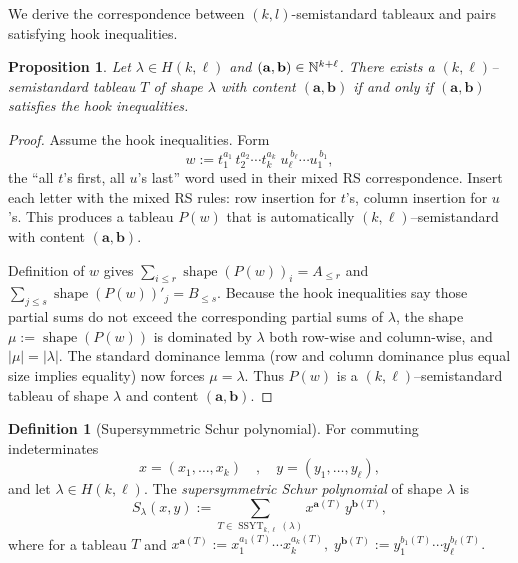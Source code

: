 \documentclass[12pt,a4paper,oneside]{amsart}
\newtheorem{proposition}{Proposition}[section]
\theoremstyle{definition}
\newtheorem{definition}{Definition}[section]
\begin{document}
We derive the correspondence between $(k,l)$-semistandard tableaux and pairs satisfying hook inequalities.
\begin{proposition}\label{prop:hook-content}
    Let $\lambda\in H(k,\ell)$ and
$(\mathbf a,\mathbf b)\in\Bbb N^{k+\ell}$.
There exists a $(k,\ell)$–semistandard tableau $T$ of shape $\lambda$
with content $(\mathbf a,\mathbf b)$ if and only if
$(\mathbf a,\mathbf b)$ satisfies the hook inequalities.
\end{proposition}

\begin{proof}
    Assume the hook inequalities. Form
\[
   w:=t_1^{a_1}\,t_2^{a_2}\cdots t_k^{a_k}\;
      u_\ell^{\,b_\ell}\cdots u_1^{\,b_1},
\]
the “all $t$’s first, all $u$’s last” word used in their mixed RS correspondence. Insert each letter with the mixed RS rules: row insertion for $t$'s, column insertion for $u$'s. This produces a tableau $P(w)$ that is automatically $(k,\ell)$–semistandard with content $(\mathbf a,\mathbf b)$.

Definition of $w$ gives \(\sum_{i\le r}\operatorname{shape}(P(w))_i=A_{\le r}\)
and \(\sum_{j\le s}\operatorname{shape}(P(w))'_j=B_{\le s}\). Because the hook inequalities say those partial sums do not exceed the corresponding partial sums of $\lambda$, the shape $\mu:=\operatorname{shape}(P(w))$ is dominated by $\lambda$ both row-wise and column-wise, and \(|\mu|=|\lambda|\). The standard dominance lemma (row and column dominance plus equal size implies equality) now forces $\mu=\lambda$. Thus $P(w)$ is a $(k,\ell)$–semistandard tableau of shape $\lambda$ and content $(\mathbf a,\mathbf b)$.
\end{proof}



\begin{definition}[Supersymmetric Schur polynomial]
\label{def:S-lambda}
For commuting indeterminates
\[
   x=(x_1,\dots ,x_k) \quad ,\quad
   y=(y_1,\dots ,y_\ell),
\]
and let $\lambda\in H(k,\ell)$. The \emph{supersymmetric Schur polynomial} of shape $\lambda$ is
\[
   S_\lambda(x,y)
      :=\sum_{T\in\operatorname{SSYT}_{k,\ell}(\lambda)}
          x^{\mathbf a(T)}\,y^{\mathbf b(T)},
\]
where for a tableau $T$ and 
$
   x^{\mathbf a(T)}
      :=x_1^{a_1(T)}\!\cdots x_k^{a_k(T)},
   \;
   y^{\mathbf b(T)}
      :=y_1^{b_1(T)}\!\cdots y_\ell^{b_\ell(T)}.
$
\end{definition}
\end{document}
